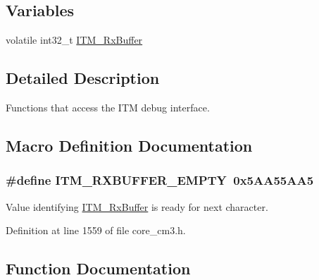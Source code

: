 \subsection*{Variables}
\begin{DoxyCompactItemize}
\item 
volatile int32\+\_\+t \hyperlink{group__CMSIS__core__DebugFunctions_ga12e68e55a7badc271b948d6c7230b2a8}{I\+T\+M\+\_\+\+Rx\+Buffer}
\end{DoxyCompactItemize}


\subsection{Detailed Description}
Functions that access the I\+TM debug interface. 



\subsection{Macro Definition Documentation}
\subsubsection[{\texorpdfstring{I\+T\+M\+\_\+\+R\+X\+B\+U\+F\+F\+E\+R\+\_\+\+E\+M\+P\+TY}{ITM_RXBUFFER_EMPTY}}]{\setlength{\rightskip}{0pt plus 5cm}\#define I\+T\+M\+\_\+\+R\+X\+B\+U\+F\+F\+E\+R\+\_\+\+E\+M\+P\+TY~0x5\+A\+A55\+A\+A5}\hypertarget{group__CMSIS__core__DebugFunctions_gaa822cb398ee022b59e9e6c5d7bbb228a}{}\label{group__CMSIS__core__DebugFunctions_gaa822cb398ee022b59e9e6c5d7bbb228a}
Value identifying \hyperlink{group__CMSIS__core__DebugFunctions_ga12e68e55a7badc271b948d6c7230b2a8}{I\+T\+M\+\_\+\+Rx\+Buffer} is ready for next character. 

Definition at line 1559 of file core\+\_\+cm3.\+h.



\subsection{Function Documentation}
